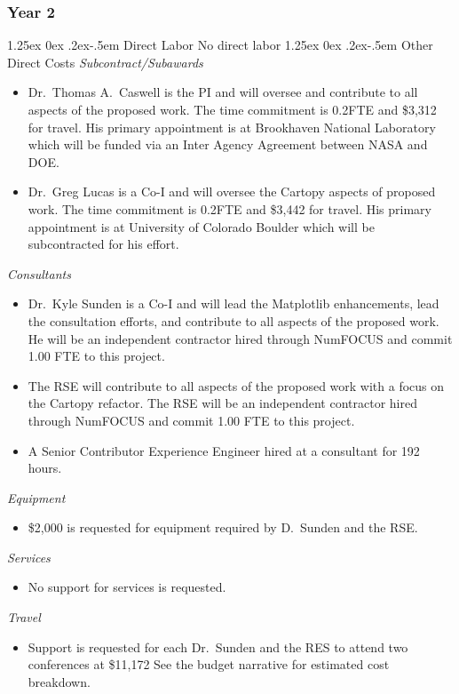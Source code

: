 \documentclass[12pt]{article}
\makeatletter
\numberwithin{page}{section}
\renewcommand{\paragraph}{%
  \@startsection{paragraph}{4}%
  {\z@}{1.25ex \@plus 0ex \@minus .2ex}{-.5em}%
  {\normalfont\normalsize\itshape\bfseries}%
}
\makeatother
\begin{document}
\subsubsection{Year 2}
\paragraph{Direct Labor}
No direct labor
\paragraph{Other Direct Costs}
\textit{Subcontract/Subawards}
\begin{itemize}
  \item Dr.\ Thomas A.\ Caswell is the PI and will oversee and contribute to
    all aspects of the proposed work.  The time commitment is 0.2FTE and \$3,312
    for travel.  His primary appointment is at Brookhaven National Laboratory
    which will be funded via an Inter Agency Agreement between NASA and DOE.
  \item Dr.\ Greg Lucas is a Co-I and will oversee the Cartopy aspects of
    proposed work.  The time commitment is 0.2FTE and \$3,442 for travel.
    His primary appointment is at University of Colorado Boulder which will be
    subcontracted for his effort.
\end{itemize}
\textit{Consultants}
\begin{itemize}
  \item Dr.\ Kyle Sunden is a Co-I and will lead the Matplotlib enhancements,
    lead the consultation efforts, and contribute to all aspects of the
    proposed work.  He will be an independent contractor hired through NumFOCUS and commit
    1.00 FTE to this project.
  \item The RSE will contribute to all aspects of the proposed work with a
    focus on the Cartopy refactor.  The RSE will be an independent contractor hired
    through NumFOCUS and commit 1.00 FTE to this project.
  \item A Senior Contributor Experience Engineer hired at a consultant for 192 hours.

\end{itemize}
\textit{Equipment}
\begin{itemize}
\item \$2,000 is requested for equipment required by D.\ Sunden and the RSE.
\end{itemize}
\textit{Services}
\begin{itemize}
\item No support for services is requested.
\end{itemize}
\textit{Travel}
\begin{itemize}
\item Support is requested for each Dr.\ Sunden and the RES to attend two conferences at
  \$11,172  See the budget narrative for estimated cost  breakdown.
\end{itemize}
\end{document}
